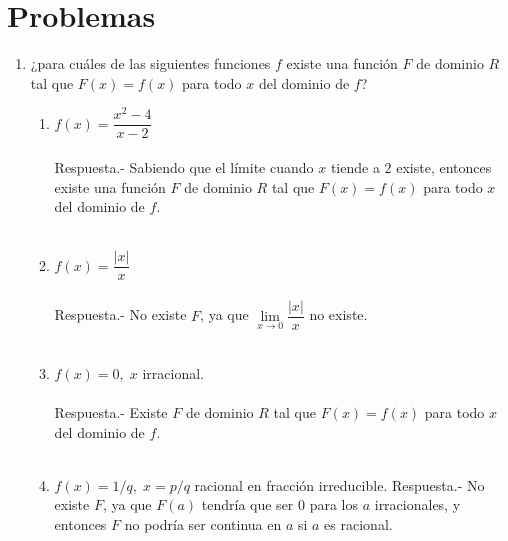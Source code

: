 \section{Problemas}
\begin{enumerate}

\item ¿para cuáles de las siguientes funciones $f$ existe una función $F$ de dominio $R$ tal que $F(x)=f(x)$ para todo $x$ del dominio de $f$?

    \begin{enumerate}

	\item $f(x) = \dfrac{x^2 - 4}{x - 2}$\\\\
	    Respuesta.-\; Sabiendo que el límite cuando $x$ tiende a $2$ existe, entonces existe una función $F$ de dominio $R$ tal que $F(x)=f(x)$ para todo $x$ del dominio de $f$.\\\\

	\item $f(x) = \dfrac{|x|}{x}$\\\\
	    Respuesta.-\; No existe $F$, ya que $\lim\limits_{x\to 0} \dfrac{|x|}{x}$ no existe.\\\\

	\item $f(x) = 0,\; x$ irracional.\\\\
	    Respuesta.-\; Existe $F$ de dominio $R$ tal que $F(x)=f(x)$ para todo $x$ del dominio de $f$.\\\\

	\item $f(x) = 1/q, \; x = p/q$ racional en fracción irreducible.
	    Respuesta.-\; No existe $F$, ya que $F(a)$ tendría que ser $0$ para los $a$ irracionales, y entonces $F$ no podría ser continua en $a$ si $a$ es racional.\\\\

    \end{enumerate}


\end{enumerate}
